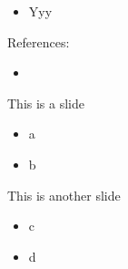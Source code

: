 \documentclass{beamer-control}
\begin{document}

\begin{SUMMARY}
\begin{itemize}
\item Yyy
\end{itemize}
\vfill References:
\begin{itemize}
\item {}
\end{itemize}
\end{SUMMARY}




\begin{frame}{This is a slide}
\begin{itemize}
\item a
\item b
\end{itemize}
\end{frame}



\begin{frame}{This is another slide}
\begin{itemize}
\item c
\item d
\end{itemize}
\end{frame}


\SUMMARYFRAME
\FINALE
\end{document}
